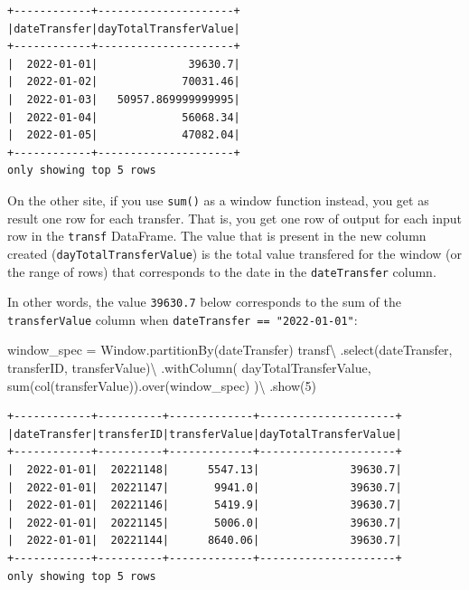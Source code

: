 \documentclass[
  11pt,
  letterpaper,
  DIV=11,
  numbers=noendperiod]{scrreprt}
\newenvironment{Shaded}{\begin{snugshade}}{\end{snugshade}}
\newcommand{\BuiltInTok}[1]{\textcolor[rgb]{0.00,0.23,0.31}{#1}}
\newcommand{\DecValTok}[1]{\textcolor[rgb]{0.68,0.00,0.00}{#1}}
\newcommand{\NormalTok}[1]{\textcolor[rgb]{0.00,0.23,0.31}{#1}}
\newcommand{\OperatorTok}[1]{\textcolor[rgb]{0.37,0.37,0.37}{#1}}
\newcommand{\StringTok}[1]{\textcolor[rgb]{0.13,0.47,0.30}{#1}}
\begin{document}
\begin{verbatim}
+------------+---------------------+
|dateTransfer|dayTotalTransferValue|
+------------+---------------------+
|  2022-01-01|              39630.7|
|  2022-01-02|             70031.46|
|  2022-01-03|   50957.869999999995|
|  2022-01-04|             56068.34|
|  2022-01-05|             47082.04|
+------------+---------------------+
only showing top 5 rows
\end{verbatim}

On the other site, if you use \texttt{sum()} as a window function
instead, you get as result one row for each transfer. That is, you get
one row of output for each input row in the \texttt{transf} DataFrame.
The value that is present in the new column created
(\texttt{dayTotalTransferValue}) is the total value transfered for the
window (or the range of rows) that corresponds to the date in the
\texttt{dateTransfer} column.

In other words, the value \texttt{39630.7} below corresponds to the sum
of the \texttt{transferValue} column when
\texttt{dateTransfer\ ==\ "2022-01-01"}:

\begin{Shaded}
\begin{Highlighting}[]
\NormalTok{window\_spec }\OperatorTok{=}\NormalTok{ Window.partitionBy(}\StringTok{\textquotesingle{}dateTransfer\textquotesingle{}}\NormalTok{)}
\NormalTok{transf}\OperatorTok{\textbackslash{}}
\NormalTok{    .select(}\StringTok{\textquotesingle{}dateTransfer\textquotesingle{}}\NormalTok{, }\StringTok{\textquotesingle{}transferID\textquotesingle{}}\NormalTok{, }\StringTok{\textquotesingle{}transferValue\textquotesingle{}}\NormalTok{)}\OperatorTok{\textbackslash{}}
\NormalTok{    .withColumn(}
        \StringTok{\textquotesingle{}dayTotalTransferValue\textquotesingle{}}\NormalTok{,}
        \BuiltInTok{sum}\NormalTok{(col(}\StringTok{\textquotesingle{}transferValue\textquotesingle{}}\NormalTok{)).over(window\_spec)}
\NormalTok{    )}\OperatorTok{\textbackslash{}}
\NormalTok{    .show(}\DecValTok{5}\NormalTok{)}
\end{Highlighting}
\end{Shaded}

\begin{verbatim}
+------------+----------+-------------+---------------------+
|dateTransfer|transferID|transferValue|dayTotalTransferValue|
+------------+----------+-------------+---------------------+
|  2022-01-01|  20221148|      5547.13|              39630.7|
|  2022-01-01|  20221147|       9941.0|              39630.7|
|  2022-01-01|  20221146|       5419.9|              39630.7|
|  2022-01-01|  20221145|       5006.0|              39630.7|
|  2022-01-01|  20221144|      8640.06|              39630.7|
+------------+----------+-------------+---------------------+
only showing top 5 rows
\end{verbatim}
\end{document}

